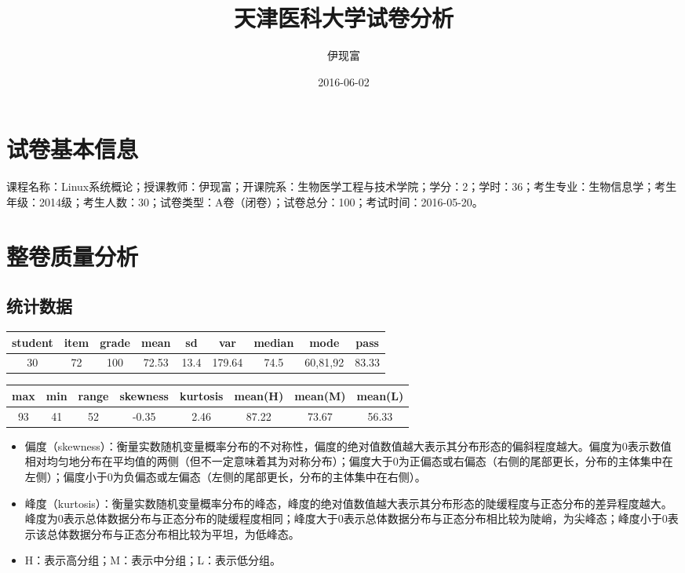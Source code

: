 \documentclass[hyperref,adobefonts]{ctexart}
\title{天津医科大学试卷分析}
\author{伊现富}
\date{2016-06-02}
\providecommand{\tightlist}{\setlength{\itemsep}{0pt}\setlength{\parskip}{0pt}}
\begin{document}
\maketitle

{
\setcounter{tocdepth}{2}
\tableofcontents
}
\section{试卷基本信息}

课程名称：Linux系统概论；授课教师：伊现富；开课院系：生物医学工程与技术学院；学分：2；学时：36；考生专业：生物信息学；考生年级：2014级；考生人数：30；试卷类型：A卷（闭卷）；试卷总分：100；考试时间：2016-05-20。

\section{整卷质量分析}

\subsection{统计数据}

\begin{longtable}{c|c|c|c|c|c|c|c|c}
\hline
student & item & grade & mean & sd & var & median & mode & pass\\
\hline
30 & 72 & 100 & 72.53 & 13.4 & 179.64 & 74.5 & 60,81,92 & 83.33\\
\hline
\end{longtable}

\begin{longtable}{c|c|c|c|c|c|c|c}
\hline
max & min & range & skewness & kurtosis & mean(H) & mean(M) & mean(L)\\
\hline
93 & 41 & 52 & -0.35 & 2.46 & 87.22 & 73.67 & 56.33\\
\hline
\end{longtable}

\begin{itemize}
\tightlist
\item
  偏度（skewness）：衡量实数随机变量概率分布的不对称性，偏度的绝对值数值越大表示其分布形态的偏斜程度越大。偏度为0表示数值相对均匀地分布在平均值的两侧（但不一定意味着其为对称分布）；偏度大于0为正偏态或右偏态（右侧的尾部更长，分布的主体集中在左侧）；偏度小于0为负偏态或左偏态（左侧的尾部更长，分布的主体集中在右侧）。
\item
  峰度（kurtosis）：衡量实数随机变量概率分布的峰态，峰度的绝对值数值越大表示其分布形态的陡缓程度与正态分布的差异程度越大。峰度为0表示总体数据分布与正态分布的陡缓程度相同；峰度大于0表示总体数据分布与正态分布相比较为陡峭，为尖峰态；峰度小于0表示该总体数据分布与正态分布相比较为平坦，为低峰态。
\item
  H：表示高分组；M：表示中分组；L：表示低分组。
\end{itemize}
\end{document}
